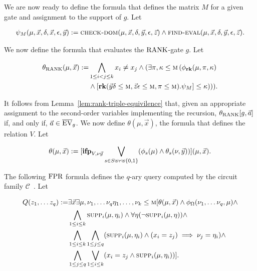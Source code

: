 \documentclass[../paper.tex]{subfiles}
\begin{document}
We are now ready to define the formula that defines the matrix $M$ for a given
gate and assignment to the support of $g$. Let
				
\begin{align*}
	\psi_M (\mu, \vec{x}, \delta, \vec{x}, \epsilon, \vec{y}) :=  \textsc{check-dom}(\mu, \vec{x}, \delta, \vec{y}, \epsilon, \vec{z}) \land \textsc{find-eval} (\mu, \vec{x}, \delta, \vec{y}, \epsilon, \vec{z}).
\end{align*}
				
We now define the formula that evaluates the $\text{\upshape RANK}$-gate $g$. Let
				
\begin{align*}
	\theta_\text{\upshape RANK} (\mu, \vec{x}) := & \bigwedge_{1 \leq i < j \leq k} x_i \neq x_j \land (\exists \pi, \kappa \leq \textsc{m} \, (\phi_{\text{\textbf{rk}}}(\mu, \pi, \kappa) \\ &\land [\text{\textbf{rk}} (\vec{y}\delta\leq \textsc{m}, \vec{z}\epsilon\leq \textsc{m}, \pi \leq \textsc{m}). \psi_M] \leq \kappa ))).
\end{align*}

It follows from Lemma~\ref{lem:rank-triple-equivilence} that, given an
appropriate assignment to the second-order variables implementing the recursion,
$\theta_{\text{\upshape RANK}}[g, \vec{a}]$ if, and only if, $\vec{a} \in \overline{\text{EV}}_g$. We
now define $\theta(\mu, \vec{x})$, the formula that defines the relation $V$.
Let

\begin{align*}
	\theta (\mu, \vec{x}) := [\text{\textbf{ifp}}_{V,\nu \vec{y}} \bigvee_{s \in  S \uplus \tau \uplus \{0,1\}} (\phi_s(\mu) \land \theta_s (\nu, \vec{y} ))] (\mu, \vec{x}).
\end{align*}

The following $\text{\upshape FPR}$ formula defines the $q$-ary query computed by the circuit
family $\mathcal{C}$~\cite{AndersonD17}. Let
				
\begin{align*}
	Q (z_1, \ldots z_q) := & \exists \vec{x} \exists \mu, \nu_1 , \ldots  \nu_q \eta_1 , \ldots , \nu_k \leq \textsc{m} [\theta (\mu, \vec{x}) \land \phi_\Omega (\nu_1, \ldots \nu_q, \mu) \land \\
                         & \bigwedge_{1 \leq i \leq k} \textsc{supp}_i (\mu, \eta_i) \wedge \forall \eta (\neg \textsc{supp}_i (\mu, \eta)) \land \\
                         & \bigwedge_{1 \leq i \leq k} \bigwedge_{1 \leq j \leq q}(\textsc{supp}_i (\mu, \eta_i) \land (x_i = z_j) \implies \nu_j = \eta_i) \land \\ &                                                                                                                                                        \bigwedge_{1 \leq j \leq q} \bigvee_{1 \leq i \leq k} (x_i = z_j \land \textsc{supp}_i (\mu, \eta_i))].
\end{align*}
				
\end{document}

